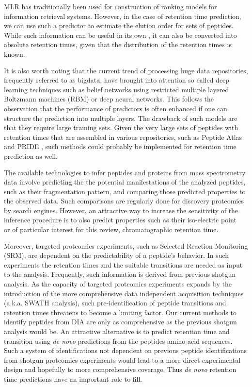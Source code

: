 \documentclass[a4paper]{article}
\begin{document}
MLR has traditionally been used for construction of ranking models for
information retrieval systems. However, in the case of retention time
prediction, we can use such a predictor to estimate the elution order
for sets of peptides. While such information can be useful in its own
\cite{bailey2012instant}, it can also be converted into absolute
retention times, given that the distribution of the retention times is
known.

It is also worth noting that the current trend of processing huge data
repositories, frequently referred to as bigdata, have brought into
attention so called deep learning techniques such as belief networks
using restricted multiple layered Boltzmann machines (RBM)
\cite{salakhutdinov2009deep} or deep neural networks. This follows the
observation that the performance of predictors is often enhanced if
one can structure the prediction into multiple layers. The drawback of
such models are that they require large training sets. Given the very
large sets of peptides with retention times that are assembled in
various repositories, such as Peptide Atlas
\cite{desiere2006peptideatlas} and PRIDE \cite{martens2005pride}, such
methods could probably be implemented for retention time prediction as
well.

The available technologies to infer peptides and proteins from mass
spectrometry data involve predicting the the potential manifestations
of the analyzed peptides, such as their fragmentation pattern, and
comparing those predicted properties to the observed data. Such
comparisons are regularly done for discovery proteomics by search
engines. However, an attractive way to increase the sensitivity of the
inference procedure is to also predict properties such as their
iso-electric point~\cite{branca2014hirief} or of particular interest
for this review, chromatographic retention
time\cite{cerqueira2010mude}. 

Moreover, targeted proteomics experiments, such as Selected Reaction
Monitoring (SRM), are dependent on the predictability of a
peptide's behavior. In such experiments the retention times and the
suitable transitions are needed as input to the analysis. Frequently,
such information is derived from previous shotgun analysis. As the
capacity of targeted proteomics experiments expands by the
introduction of the more comprehensive data independent acquisition
techniques \cite{Venable2004} (a.k.a. SWATH analysis), such
pre-identification of peptide transitions and retention times
threatens to become a limiting factor. Our current methods to identify
peptides from DIA are only as comprehensive as the previous shotgun
analysis would be. An attractive alternative is to predict retention
time and transition using {\em de novo} predictions from the peptides
amino acid sequences.  Such a system of identifications not dependent
on previous peptide identifications from shotgun proteomics experiments
would lead to a more direct experimental design and hopefully to more
comprehensive coverage. Thus {\em de novo} retention time predictions
have an important role to fill.




\end{document}
